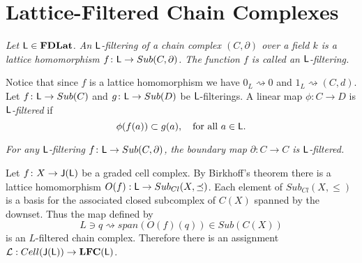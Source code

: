 \section{Lattice-Filtered Chain Complexes}\label{sec:lfc}



\begin{defn}
{\em
Let ${\mathsf L}\in {\bf FDLat}$.
An \emph{${\mathsf L}$-filtering of a chain complex $(C,\partial)$ over a field $k$} is a lattice homomorphism $f\colon {\mathsf L} \to Sub(C,\partial)$.
The function $f$ is called an \emph{${\mathsf L}$-filtering}.
}
\end{defn}


Notice that since $f$ is a lattice homomorphism we have $0_L\rightsquigarrow 0$ and $1_L \rightsquigarrow (C,d)$.  Let $f\colon {\mathsf L} \to Sub(C)$ and $g\colon {\mathsf L} \to Sub(D)$ be ${\mathsf L}$-filterings. 
A linear map $\phi\colon C\to D$ is {\em ${\mathsf L}$-filtered} if
\[
\phi(f(a)) \subset g(a),\quad\text{for all $a\in{\mathsf L}$}.
\]




\begin{ex}
{\em
For any ${\mathsf L}$-filtering $f\colon {\mathsf L} \to Sub(C,\partial)$,
the boundary map $\partial\colon C\to C$ is ${\mathsf L}$-filtered.
}
\end{ex}

\begin{ex}


Let $f\colon X\to {\mathsf J}({\mathsf L})$ be a graded cell complex.  By Birkhoff's theorem there is a lattice homomorphism $O(f):{\mathsf L}\to Sub_{Cl}(X,\preceq)$.  Each element of $Sub_{Cl}(X,\leq)$ is a basis for the associated closed subcomplex of $C(X)$ spanned by the downset.   Thus the map defined by $$L\ni q\rightsquigarrow span(O(f)(q))\in Sub(C(X))$$ is an $L$-filtered chain complex.  Therefore there is an assignment ${\mathcal L}:Cell({\mathsf J}({\mathsf L}))\to {\bf LFC}({\mathsf L})$.


 
\end{ex}







